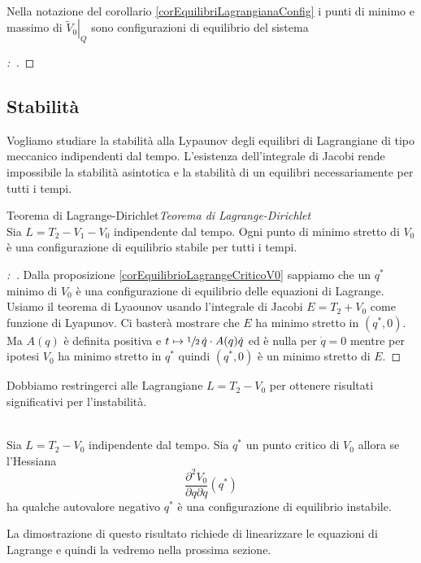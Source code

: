 \documentclass[11pt,a4paper,twoside]{book}
\newenvironment{proposizione}[1][\empty]{\begin{Proposizione}{
\ifx\empty#1\relax\else\mdseries\itshape#1\\\fi
}{}}{\end{Proposizione}}
\newenvironment{corollario}[1][\empty]{\begin{Corollario}{
\ifx\empty#1\relax\else\mdseries\itshape#1\\\fi
}{}}{\end{Corollario}}
\newenvironment{dimo}[1][\proofname]{
	\begin{tcolorbox}[
	breakable, 
	enhanced, 
	interior hidden, 
	frame hidden, 
	borderline west = {1pt}{0pt}{gray}, 
	top=0pt, bottom=0pt, left=0pt]
\begin{proof}[#1:~]
}
{
\end{proof}
\end{tcolorbox}
}
\theoremstyle{esss}
\theoremstyle{dotless}
\numberwithin{equation}{section} %
\begin{document}
\begin{corollario}Nella notazione del corollario \ref{corEquilibriLagrangianaConfig} i punti di minimo e  massimo di $\left.\tilde{V}_0\right|_Q$ sono configurazioni di equilibrio del sistema
\end{corollario}
\begin{dimo}
\end{dimo}

\subsection{Stabilità}
Vogliamo studiare la stabilità alla Lypaunov degli equilibri di Lagrangiane di tipo meccanico indipendenti dal tempo. L'esistenza dell'integrale di Jacobi rende impossibile la stabilità asintotica e la stabilità di un equilibri necessariamente per tutti i tempi. 

\begin{proposizione}[Teorema di Lagrange-Dirichlet]\label{teoLagrangeDirichlet}
Sia $L=T_2-V_1-V_0$ indipendente dal tempo. Ogni punto di minimo stretto di $V_0$ è una configurazione di equilibrio stabile per tutti i tempi.
\end{proposizione}
\begin{dimo}
Dalla proposizione \ref{corEquilibrioLagrangeCriticoV0} sappiamo che un $q^*$ minimo di $V_0$ è una configurazione di equilibrio delle equazioni di Lagrange.
Usiamo il teorema di Lyaounov usando l'integrale di Jacobi $E=T_2+V_0$ come funzione di Lyapunov. Ci basterà mostrare che $E$ ha minimo stretto in $(q^*,0)$. Ma $A(q)$ è definita positiva e $t\mapsto\sfrac{1}{2} \,\dot{q}\cdot A(q)\dot{q}$ ed è nulla per $\dot{q}=0$ mentre per ipotesi $V_0$ ha minimo stretto in $q^*$ quindi $(q^*,0)$ è un minimo stretto di $E$.\qedhere
\end{dimo}

Dobbiamo restringerci alle Lagrangiane $L=T_2-V_0$ per ottenere risultati significativi per l'instabilità.

\begin{proposizione}\label{propInstabilitàEquilibriLagrange}
Sia $L=T_2-V_0$ indipendente dal tempo. Sia $q^*$ un punto critico di $V_0$ allora se l'Hessiana \[\dfrac{\partial^2V_0}{\partial q\partial q}(q^*)\] ha qualche autovalore negativo $q^*$ è una configurazione di equilibrio instabile.
\end{proposizione}
La dimostrazione di questo risultato richiede di linearizzare le equazioni di Lagrange e quindi la vedremo nella prossima sezione.
\end{document}
